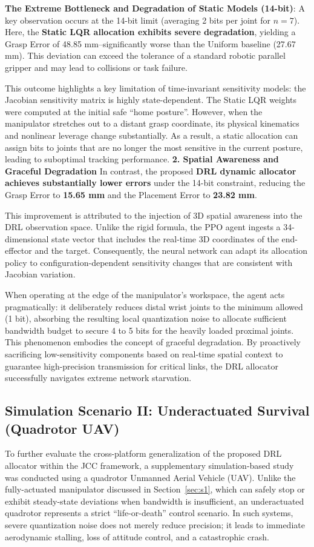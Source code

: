 \noindent\textbf{The Extreme Bottleneck and Degradation of Static Models (14-bit)}: A key observation occurs at the 14-bit limit (averaging 2 bits per joint for $n=7$). 
Here, the \textbf{Static LQR allocation exhibits severe degradation}, yielding a Grasp Error of 48.85 mm--significantly worse than the Uniform baseline (27.67 mm). This deviation can exceed the tolerance of a standard robotic parallel gripper and may lead to collisions or task failure.

This outcome highlights a key limitation of time-invariant sensitivity models: the Jacobian sensitivity matrix is highly state-dependent. The Static LQR weights were computed at the initial safe ``home posture''. 
However, when the manipulator stretches out to a distant grasp coordinate, its physical kinematics and nonlinear leverage change substantially. As a result, a static allocation can assign bits to joints that are no longer the most sensitive in the current posture, leading to suboptimal tracking performance.
\noindent\textbf{2. Spatial Awareness and Graceful Degradation}
In contrast, the proposed \textbf{DRL dynamic allocator achieves substantially lower errors} under the 14-bit constraint, reducing the Grasp Error to \textbf{15.65 mm} and the Placement Error to \textbf{23.82 mm}.

This improvement is attributed to the injection of 3D spatial awareness into the DRL observation space. Unlike the rigid formula, the PPO agent 
ingests a 34-dimensional state vector that includes the real-time 3D coordinates of the end-effector and the target. Consequently, the neural 
network can adapt its allocation policy to configuration-dependent sensitivity changes that are consistent with Jacobian variation.

When operating at the edge of the manipulator's workspace, the agent acts pragmatically: it deliberately reduces distal wrist joints to the minimum allowed (1 bit), absorbing the resulting local quantization noise to allocate sufficient bandwidth budget to secure 4 to 5 bits for the heavily loaded proximal joints. 
This phenomenon embodies the concept of graceful degradation. By proactively sacrificing low-sensitivity components based on real-time spatial context to guarantee high-precision transmission for critical links, the DRL allocator successfully navigates extreme network starvation.
\subsection{Simulation Scenario II: Underactuated Survival (Quadrotor UAV)}
To further evaluate the cross-platform generalization of the proposed DRL allocator within the JCC framework, a supplementary simulation-based study was conducted using a quadrotor Unmanned Aerial Vehicle (UAV). Unlike the fully-actuated manipulator discussed in Section~\ref{sec:s1}, which can safely stop or exhibit steady-state deviations when bandwidth is insufficient, an underactuated quadrotor represents a strict ``life-or-death'' control scenario.
In such systems, severe quantization noise does not merely reduce precision; it leads to immediate aerodynamic stalling, loss of 
attitude control, and a catastrophic crash.
